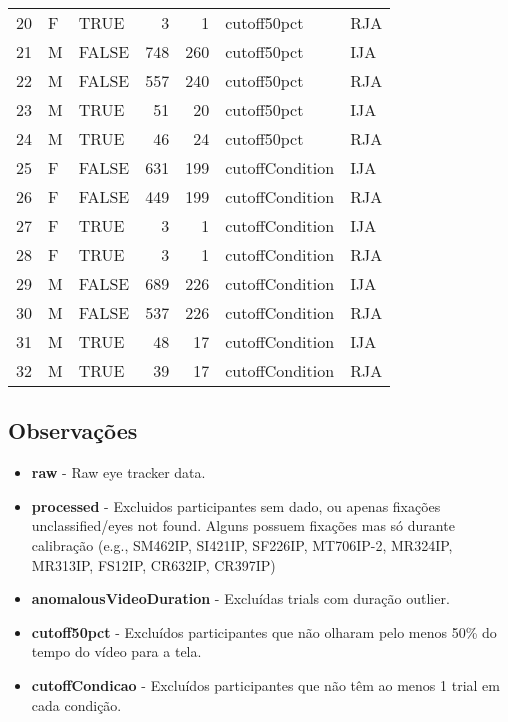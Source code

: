 \documentclass{article}
\begin{document}
\begin{table}[ht]
\begin{tabular}{rllrrll}
  20 & F & TRUE &   3 &   1 & cutoff50pct & RJA \\ 
  21 & M & FALSE & 748 & 260 & cutoff50pct & IJA \\ 
  22 & M & FALSE & 557 & 240 & cutoff50pct & RJA \\ 
  23 & M & TRUE &  51 &  20 & cutoff50pct & IJA \\ 
  24 & M & TRUE &  46 &  24 & cutoff50pct & RJA \\ 
  25 & F & FALSE & 631 & 199 & cutoffCondition & IJA \\ 
  26 & F & FALSE & 449 & 199 & cutoffCondition & RJA \\ 
  27 & F & TRUE &   3 &   1 & cutoffCondition & IJA \\ 
  28 & F & TRUE &   3 &   1 & cutoffCondition & RJA \\ 
  29 & M & FALSE & 689 & 226 & cutoffCondition & IJA \\ 
  30 & M & FALSE & 537 & 226 & cutoffCondition & RJA \\ 
  31 & M & TRUE &  48 &  17 & cutoffCondition & IJA \\ 
  32 & M & TRUE &  39 &  17 & cutoffCondition & RJA \\ 
   \hline
\end{tabular}
\end{table}

\subsection{Observações}

\begin{itemize}
  \item \textbf{raw} - Raw eye tracker data. 
  \item \textbf{processed} - Excluidos participantes sem dado, ou apenas fixações unclassified/eyes not found. Alguns possuem fixações mas só durante calibração (e.g., SM462IP, SI421IP, SF226IP, MT706IP-2, MR324IP, MR313IP, FS12IP, CR632IP, CR397IP)
  \item \textbf{anomalousVideoDuration} - Excluídas trials com duração outlier.
  \item \textbf{cutoff50pct} - Excluídos participantes que não olharam pelo menos 50\% do tempo do vídeo para a tela.
  \item \textbf{cutoffCondicao} - Excluídos participantes que não têm ao menos 1 trial em cada condição.
\end{itemize}
\end{document}
